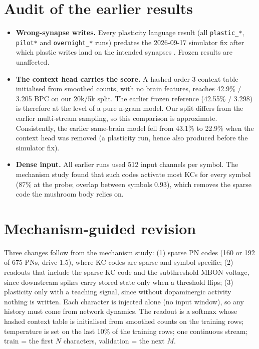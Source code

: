 \documentclass[conference]{IEEEtran}
\begin{document}
\section{Audit of the earlier results}
\begin{itemize}
\item \textbf{Wrong-synapse writes.} Every plasticity language result (all
\texttt{plastic\_*}, \texttt{pilot*} and \texttt{overnight\_*} runs) predates
the 2026-09-17 simulator fix after which plastic writes land on the intended
synapses \cite{mechpaper}. Frozen results are unaffected.
\item \textbf{The context head carries the score.} A hashed order-3 context
table initialised from smoothed counts, with no brain features, reaches
42.9\% / 3.205 BPC on our 20k/5k split. The earlier frozen reference
(42.55\% / 3.298) is therefore at the level of a pure n-gram model. Our split
differs from the earlier multi-stream sampling, so this comparison is
approximate. Consistently, the earlier same-brain model fell from 43.1\% to
22.9\% when the context head was removed (a plasticity run, hence also
produced before the simulator fix).
\item \textbf{Dense input.} All earlier runs used 512 input channels per
symbol. The mechanism study found that such codes activate most KCs for every
symbol (87\% at the probe; overlap between symbols 0.93), which removes the
sparse code the mushroom body relies on.
\end{itemize}

\section{Mechanism-guided revision}\label{sec:revision}
Three changes follow from the mechanism study: (1) sparse PN codes (160 or 192
of 675 PNs, drive 1.5), where KC codes are sparse and symbol-specific;
(2) readouts that include the sparse KC code and the subthreshold MBON voltage,
since downstream spikes carry stored state only when a threshold flips;
(3) plasticity only with a teaching signal, since without dopaminergic
activity nothing is written. Each character is injected alone (no input
window), so any history must come from network dynamics. The readout is a
softmax whose hashed context table is initialised from smoothed counts on the
training rows; temperature is set on the last 10\% of the training rows; one
continuous stream; train = the first $N$ characters, validation = the next $M$.
\end{document}
